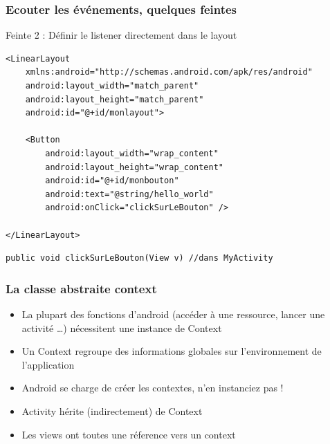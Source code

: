 \documentclass{beamer}
\begin{document}
\begin{frame}[fragile]
\frametitle{Ecouter les événements, quelques feintes}
Feinte 2 : Définir le listener directement dans le layout
\begin{lstlisting}
<LinearLayout 
	xmlns:android="http://schemas.android.com/apk/res/android"
    android:layout_width="match_parent"
    android:layout_height="match_parent"
    android:id="@+id/monlayout">

    <Button
        android:layout_width="wrap_content"
        android:layout_height="wrap_content"
        android:id="@+id/monbouton"
        android:text="@string/hello_world"
        android:onClick="clickSurLeBouton" />

</LinearLayout>
\end{lstlisting}
\begin{lstlisting}
public void clickSurLeBouton(View v) //dans MyActivity
\end{lstlisting}
\end{frame}

\begin{frame}[fragile]
\frametitle{La classe abstraite context}
\begin{itemize}
 \item La plupart des fonctions d'android (accéder à une ressource,
 lancer une activité \ldots) nécessitent une instance de Context
 \item Un Context regroupe des informations globales sur l'environnement de
 l'application
 \item Android se charge de créer les contextes, n'en instanciez pas !
 \item Activity hérite (indirectement) de Context
 \item Les views ont toutes une réference vers un context
 \end{itemize}
\end{frame}
\end{document}
